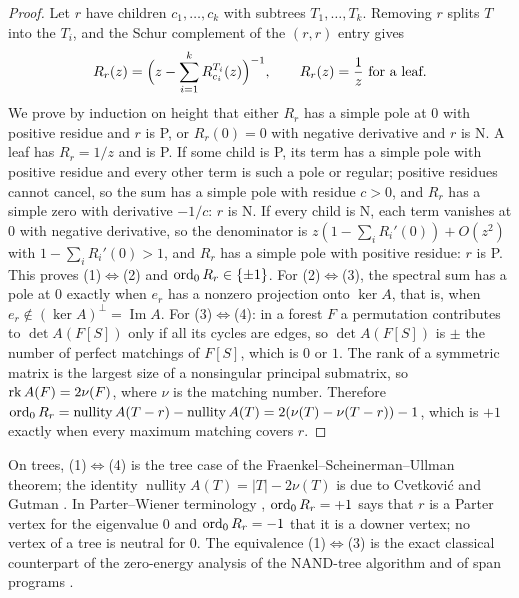 \begin{proof}
Let $r$ have children $c_1,\dots,c_k$ with subtrees $T_1,\dots,T_k$. Removing $r$ splits $T$ into the $T_i$, and the Schur complement of the $(r,r)$ entry gives
\begin{equation}\label{eq:schur}
R_r(z)=\Bigl(z-\sum_{i=1}^kR^{T_i}_{c_i}(z)\Bigr)^{-1},\qquad R_r(z)=\frac1z\ \text{for a leaf.}
\end{equation}
We prove by induction on height that either $R_r$ has a simple pole at $0$ with positive residue and $r$ is P, or $R_r(0)=0$ with negative derivative and $r$ is N. A leaf has $R_r=1/z$ and is P. If some child is P, its term has a simple pole with positive residue and every other term is such a pole or regular; positive residues cannot cancel, so the sum has a simple pole with residue $c>0$, and $R_r$ has a simple zero with derivative $-1/c$: $r$ is N. If every child is N, each term vanishes at $0$ with negative derivative, so the denominator is $z(1-\sum_iR_i'(0))+O(z^2)$ with $1-\sum_iR_i'(0)>1$, and $R_r$ has a simple pole with positive residue: $r$ is P. This proves (1)$\Leftrightarrow$(2) and $\operatorname{ord}_0R_r\in\{\pm1\}$.
For (2)$\Leftrightarrow$(3), the spectral sum has a pole at $0$ exactly when $e_r$ has a nonzero projection onto $\ker A$, that is, when $e_r\notin(\ker A)^{\perp}=\operatorname{Im}A$. For (3)$\Leftrightarrow$(4): in a forest $F$ a permutation contributes to $\det A(F[S])$ only if all its cycles are edges, so $\det A(F[S])$ is $\pm$ the number of perfect matchings of $F[S]$, which is $0$ or $1$. The rank of a symmetric matrix is the largest size of a nonsingular principal submatrix, so $\operatorname{rk} A(F)=2\nu(F)$, where $\nu$ is the matching number. Therefore $\operatorname{ord}_0R_r=\operatorname{nullity}A(T-r)-\operatorname{nullity}A(T)=2(\nu(T)-\nu(T-r))-1$, which is $+1$ exactly when every maximum matching covers $r$.
\end{proof}

On trees, (1)$\Leftrightarrow$(4) is the tree case of the Fraenkel--Scheinerman--Ullman theorem; the identity $\operatorname{nullity}A(T)=|T|-2\nu(T)$ is due to Cvetkovi\'c and Gutman \cite{CvetkovicGutman}. In Parter--Wiener terminology \cite{JLS}, $\operatorname{ord}_0R_r=+1$ says that $r$ is a Parter vertex for the eigenvalue $0$ and $\operatorname{ord}_0R_r=-1$ that it is a downer vertex; no vertex of a tree is neutral for $0$. The equivalence (1)$\Leftrightarrow$(3) is the exact classical counterpart of the zero-energy analysis of the NAND-tree algorithm \cite{FGG} and of span programs \cite{ReichardtSpalek}.

